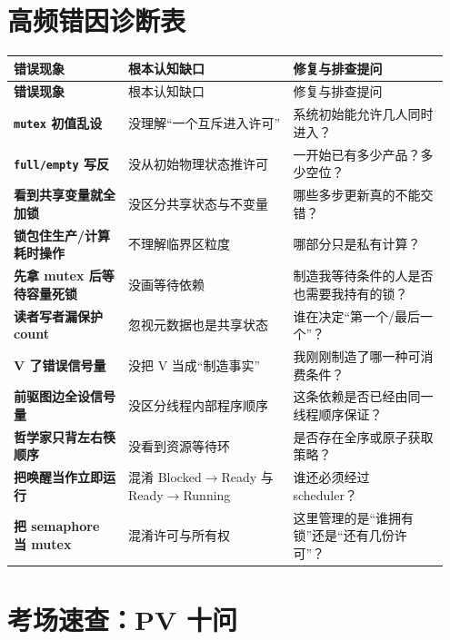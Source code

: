 \documentclass[11pt,a4paper]{ctexart}
\newcommand{\code}[1]{\texttt{#1}}
\begin{document}
\section{高频错因诊断表}

\begingroup
\small
\renewcommand{\arraystretch}{1.25}
\begin{longtable}{>{\bfseries}p{0.25\linewidth} p{0.36\linewidth} p{0.34\linewidth}}
\toprule
错误现象 & 根本认知缺口 & 修复与排查提问\\
\midrule
\endfirsthead
\toprule
错误现象 & 根本认知缺口 & 修复与排查提问\\
\midrule
\endhead
\code{mutex} 初值乱设 & 没理解“一个互斥进入许可” & 系统初始能允许几人同时进入？\\
\code{full/empty} 写反 & 没从初始物理状态推许可 & 一开始已有多少产品？多少空位？\\
看到共享变量就全加锁 & 没区分共享状态与不变量 & 哪些多步更新真的不能交错？\\
锁包住生产/计算耗时操作 & 不理解临界区粒度 & 哪部分只是私有计算？\\
先拿 mutex 后等待容量死锁 & 没画等待依赖 & 制造我等待条件的人是否也需要我持有的锁？\\
读者写者漏保护 count & 忽视元数据也是共享状态 & 谁在决定“第一个/最后一个”？\\
V 了错误信号量 & 没把 V 当成“制造事实” & 我刚刚制造了哪一种可消费条件？\\
前驱图边全设信号量 & 没区分线程内部程序顺序 & 这条依赖是否已经由同一线程顺序保证？\\
哲学家只背左右筷顺序 & 没看到资源等待环 & 是否存在全序或原子获取策略？\\
把唤醒当作立即运行 & 混淆 Blocked$\to$Ready 与 Ready$\to$Running & 谁还必须经过 scheduler？\\
把 semaphore 当 mutex & 混淆许可与所有权 & 这里管理的是“谁拥有锁”还是“还有几份许可”？\\
\bottomrule
\end{longtable}
\endgroup

\section{考场速查：PV 十问}
\end{document}
